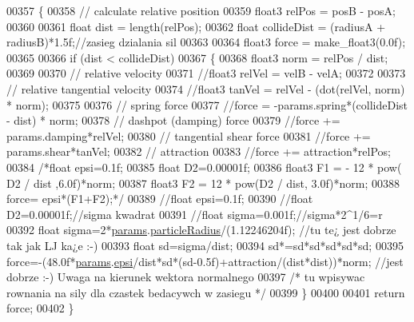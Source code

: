 \begin{DoxyCode}
00357 \{
00358     \textcolor{comment}{// calculate relative position}
00359     float3 relPos = posB - posA;
00360 
00361     \textcolor{keywordtype}{float} dist = length(relPos);
00362     \textcolor{keywordtype}{float} collideDist = (radiusA + radiusB)*1.5f;\textcolor{comment}{//zasieg dzialania sil}
00363 
00364     float3 force = make\_float3(0.0f);
00365 
00366     \textcolor{keywordflow}{if} (dist < collideDist)
00367     \{
00368         float3 norm = relPos / dist;
00369 
00370         \textcolor{comment}{// relative velocity}
00371         \textcolor{comment}{//float3 relVel = velB - velA;}
00372 
00373         \textcolor{comment}{// relative tangential velocity}
00374         \textcolor{comment}{//float3 tanVel = relVel - (dot(relVel, norm) * norm);}
00375 
00376         \textcolor{comment}{// spring force}
00377         \textcolor{comment}{//force = -params.spring*(collideDist - dist) * norm;}
00378         \textcolor{comment}{// dashpot (damping) force}
00379         \textcolor{comment}{//force += params.damping*relVel;}
00380         \textcolor{comment}{// tangential shear force}
00381         \textcolor{comment}{//force += params.shear*tanVel;}
00382         \textcolor{comment}{// attraction}
00383         \textcolor{comment}{//force += attraction*relPos;}
00384                 \textcolor{comment}{/*float epsi=0.1f;}
00385 \textcolor{comment}{                float D2=0.00001f;}
00386 \textcolor{comment}{                float3 F1 = - 12 * pow( D2 /  dist ,6.0f)*norm;}
00387 \textcolor{comment}{                float3 F2 = 12 * pow(D2 / dist, 3.0f)*norm;}
00388 \textcolor{comment}{                force= epsi*(F1+F2);*/}
00389                 \textcolor{comment}{//float epsi=0.1f;}
00390                 \textcolor{comment}{//float D2=0.00001f;//sigma kwadrat}
00391                 \textcolor{comment}{//float sigma=0.001f;//sigma*2^1/6=r}
00392                 \textcolor{keywordtype}{float} sigma=2*\hyperlink{particles__kernel__impl_8cuh_a8db8938e28edd17862daf58651051bdc}{params}.\hyperlink{struct_sim_params_a7e131c24e1020c44173deb0f57a8c4af}{particleRadius}/(1.12246204f); \textcolor{comment}{//tu te¿ jest dobrze
       tak jak LJ ka¿e :-)}
00393                 \textcolor{keywordtype}{float} sd=sigma/dist;
00394                 sd*=sd*sd*sd*sd*sd;
00395                 force=-(48.0f*\hyperlink{particles__kernel__impl_8cuh_a8db8938e28edd17862daf58651051bdc}{params}.\hyperlink{struct_sim_params_a760551182a6dff0b67f3048daa2620fb}{epsi}/dist*sd*(sd-0.5f)+attraction/(dist*dist))*norm; \textcolor{comment}{//jest
       dobrze :-) Uwaga na kierunek wektora normalnego}
00397 \textcolor{comment}{}\textcolor{comment}{/*      tu wpisywac rownania na sily dla czastek bedacywch w zasiegu    */}
00399     \}
00400 
00401     \textcolor{keywordflow}{return} force;
00402 \}
\end{DoxyCode}
